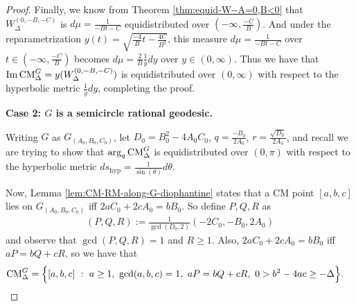 \documentclass[11pt,letterpaper,reqno]{amsart}
\numberwithin{equation}{section}
\numberwithin{figure}{section}
\numberwithin{table}{section}
\newcommand{\CM}{\textnormal{CM}}
\begin{document}
\begin{proof}
Finally, we know from Theorem \ref{thm:equid-W--A=0,B<0} that $W_{\Delta}^{(0,-B,-C)}$ is $d\mu = \frac{1}{-Bt-C}$ equidistributed over $(-\infty,\frac{-C}{B})$. And under the reparametrization 
$y(t) = \sqrt{\frac{-4}{B} t - \frac{4C}{B^2}}$, this measure $d\mu = \frac{1}{-Bt-C}$ over $t \in (-\infty,\frac{-C}{B})$ becomes $d\mu = \frac{2}{B} \frac{1}{y} dy$ over $y \in (0,\infty)$. Thus we have that $\mathrm{Im}\,\CM^{G}_{\Delta} = y(W_{\Delta}^{(0,-B,-C)})$ is  equidistributed over $(0,\infty)$ with respect to the hyperbolic metric $\frac 1y dy$, completing the proof.




\noindent\textbf{Case 2: $G$ is a semicircle rational geodesic.}

Writing $G$ as $G_{(A_0,B_0,C_0)}$, let $D_0 = B_0^2-4A_0 C_0$, $q=\frac{-B_0}{2A_0}$, $r = \frac{\sqrt{D_0}}{2A_0}$, and recall we are trying to show that $\mathrm{arg}_q\, \CM^{G}_{\Delta}$ is equidistributed over $(0,\pi)$ with respect to the hyperbolic metric $ds_\text{hyp} = \frac{1}{\sin(\theta)} d\theta$.


Now, Lemma \ref{lem:CM-RM-along-G-diophantine} states that a CM point $[a,b,c]$ lies on $G_{(A_0,B_0,C_0)}$ iff $2aC_0+2cA_0=bB_0$. So define $P,Q,R$ as
\begin{align} \label{eqn:def-PQR}
    (P,Q,R) := \tfrac{1}{\gcd(D_0,2)} (-2C_0,-B_0,2A_0) 
\end{align}
and observe that $\gcd(P,Q,R)=1$ and $R \ge 1$.
Also, $2aC_0+2cA_0=bB_0$ iff $aP=bQ+cR$, so we have that
\begin{align}
    \CM^{G}_{\Delta}  
    &= \Big\{ [a,b,c] ~:~ a \ge 1,~ \gcd(a,b,c)=1,~  aP=bQ+cR,~
    0 > b^2-4ac \ge -\Delta \Big\}.
\end{align}


\end{proof}
\end{document}
